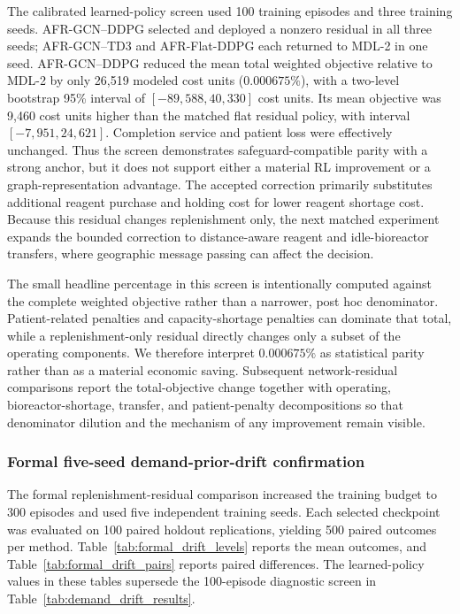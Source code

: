 \documentclass[preprint,review,12pt]{elsarticle}
\begin{document}
The calibrated learned-policy screen used 100 training episodes and three
training seeds. AFR-GCN--DDPG selected and deployed a nonzero residual in all
three seeds; AFR-GCN--TD3 and AFR-Flat-DDPG each returned to MDL-2 in one seed.
AFR-GCN--DDPG reduced the mean total weighted objective relative to MDL-2 by
only 26,519 modeled cost units ($0.000675\%$), with a two-level bootstrap
95\% interval of $[-89{,}588,40{,}330]$ cost units. Its mean objective was
9,460 cost units higher than the matched flat residual policy, with interval
$[-7{,}951,24{,}621]$. Completion service and patient loss were effectively
unchanged. Thus the screen
demonstrates safeguard-compatible parity with a strong anchor, but it does not
support either a material RL improvement or a graph-representation advantage.
The accepted correction primarily substitutes additional reagent purchase and
holding cost for lower reagent shortage cost. Because this residual changes
replenishment only, the next matched experiment expands the bounded correction
to distance-aware reagent and idle-bioreactor transfers, where geographic
message passing can affect the decision.

The small headline percentage in this screen is intentionally computed against
the complete weighted objective rather than a narrower, post hoc denominator.
Patient-related penalties and capacity-shortage penalties can dominate that
total, while a replenishment-only residual directly changes only a subset of
the operating components. We therefore interpret $0.000675\%$ as statistical
parity rather than as a material economic saving. Subsequent network-residual
comparisons report the total-objective change together with operating,
bioreactor-shortage, transfer, and patient-penalty decompositions so that
denominator dilution and the mechanism of any improvement remain visible.

\subsubsection{Formal five-seed demand-prior-drift confirmation}

The formal replenishment-residual comparison increased the training budget to
300 episodes and used five independent training seeds. Each selected
checkpoint was evaluated on 100 paired holdout replications, yielding 500
paired outcomes per method. Table~\ref{tab:formal_drift_levels} reports the
mean outcomes, and Table~\ref{tab:formal_drift_pairs} reports paired
differences. The learned-policy values in these tables supersede the
100-episode diagnostic screen in Table~\ref{tab:demand_drift_results}.
\end{document}
